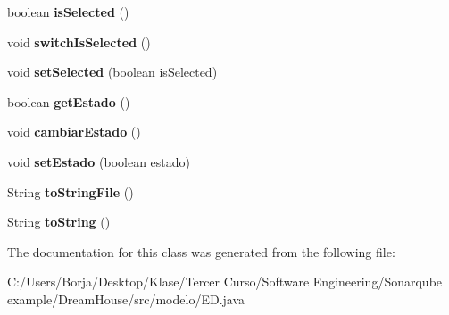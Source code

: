 \begin{DoxyCompactItemize}
boolean {\bfseries is\+Selected} ()
\item 
\mbox{\label{classmodelo_1_1_e_d_af5f19608ff75e1e2598720d53f78d020}} 
void {\bfseries switch\+Is\+Selected} ()
\item 
\mbox{\label{classmodelo_1_1_e_d_a0c76a786c73a3f35dda3126adcb96c67}} 
void {\bfseries set\+Selected} (boolean is\+Selected)
\item 
\mbox{\label{classmodelo_1_1_e_d_aadb07ef1218bda2ede87c34610084c35}} 
boolean {\bfseries get\+Estado} ()
\item 
\mbox{\label{classmodelo_1_1_e_d_af6910c0fb0772f5467f2957737903342}} 
void {\bfseries cambiar\+Estado} ()
\item 
\mbox{\label{classmodelo_1_1_e_d_ad4534d695019f9baaf841ce40dc58338}} 
void {\bfseries set\+Estado} (boolean estado)
\item 
\mbox{\label{classmodelo_1_1_e_d_ad81faa7b79bdc75f0952cba078266b1e}} 
String {\bfseries to\+String\+File} ()
\item 
\mbox{\label{classmodelo_1_1_e_d_a299fd5ea8b36c66271e0cd99e5f7f7a1}} 
String {\bfseries to\+String} ()
\end{DoxyCompactItemize}


The documentation for this class was generated from the following file\+:\begin{DoxyCompactItemize}
\item 
C\+:/\+Users/\+Borja/\+Desktop/\+Klase/\+Tercer Curso/\+Software Engineering/\+Sonarqube example/\+Dream\+House/src/modelo/E\+D.\+java\end{DoxyCompactItemize}
